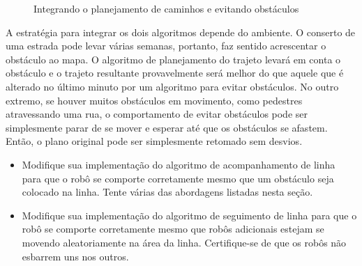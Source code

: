 \begin{figure}
\begin{center}
\caption{Integrando o planejamento de caminhos e evitando obstáculos}\label{fig.integrate-pp}
\end{center}
\end{figure}

A estratégia para integrar os dois algoritmos depende do ambiente. O conserto de uma estrada pode levar várias semanas, portanto, faz sentido acrescentar o obstáculo ao mapa. O algoritmo de planejamento do trajeto levará em conta o obstáculo e o trajeto resultante provavelmente será melhor do que aquele que é alterado no último minuto por um algoritmo para evitar obstáculos. No outro extremo, se houver muitos obstáculos em movimento, como pedestres atravessando uma rua, o comportamento de evitar obstáculos pode ser simplesmente parar de se mover e esperar até que os obstáculos se afastem. Então, o plano original pode ser simplesmente retomado sem desvios.

\begin{framed}
\begin{itemize}
\item Modifique sua implementação do algoritmo de acompanhamento de linha para que o robô se comporte corretamente mesmo que um obstáculo seja colocado na linha. Tente várias das abordagens listadas nesta seção.
\item Modifique sua implementação do algoritmo de seguimento de linha para que o robô se comporte corretamente mesmo que robôs adicionais estejam se movendo aleatoriamente na área da linha. Certifique-se de que os robôs não esbarrem uns nos outros.
\end{itemize}
\end{framed}

